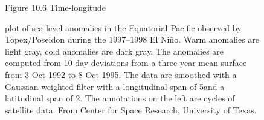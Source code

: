 \begin{figure}[t!]
\footnotesize
Figure 10.6 Time-longitude \rule{0pt}{3ex}plot of sea-level
anomalies in the Equatorial Pacific observed
by Topex/Poseidon during the 1997--1998 El
Ni\~{n}o. Warm
anomalies are light gray,
cold anomalies are dark gray. The anomalies are computed from 10-day
deviations from a three-year mean surface from 3 Oct 1992 to 8 Oct
1995. The data are smoothed with a Gaussian weighted filter with a
longitudinal span of 5\degrees and a latitudinal span of
2\degrees. The annotations on the left are cycles of satellite
data. From Center for Space Research, University of Texas.
\label{texas-may01}
\vspace{-3ex}
\end{figure}

\vspace{-1ex}


